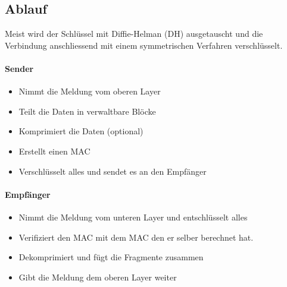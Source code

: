 \subsection{Ablauf}
Meist wird der Schlüssel mit Diffie-Helman (DH) ausgetauscht und die Verbindung anschliessend mit einem symmetrischen Verfahren verschlüsselt.

\paragraph{Sender}
\begin{itemize}
	\item Nimmt die Meldung vom oberen Layer
	\item Teilt die Daten in verwaltbare Blöcke
	\item Komprimiert die Daten (optional)
	\item Erstellt einen MAC
	\item Verschlüsselt alles und sendet es an den Empfänger
\end{itemize}

\paragraph{Empfänger}
\begin{itemize}
	\item Nimmt die Meldung vom unteren Layer und entschlüsselt alles
	\item Verifiziert den MAC mit dem MAC den er selber berechnet hat.
	\item Dekomprimiert und fügt die Fragmente zusammen
	\item Gibt die Meldung dem oberen Layer weiter
\end{itemize}

